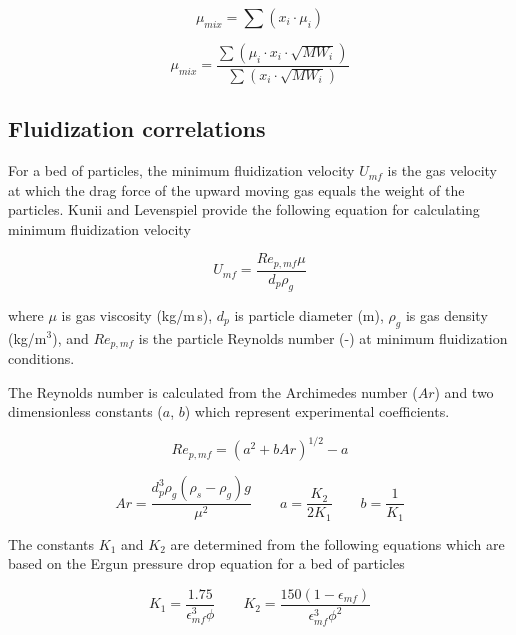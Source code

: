 \begin{equation}\label{eq:graham}
    \mu_{mix} = \sum(x_i \cdot \mu_i)
\end{equation}

\begin{equation}\label{eq:herning}
    \mu_{mix} = \frac{\sum(\mu_i \cdot x_i \cdot \sqrt{MW_i})}{\sum(x_i \cdot \sqrt{MW_i})}
\end{equation}

\subsection{Fluidization correlations}

For a bed of particles, the minimum fluidization velocity $U_{mf}$ is the gas velocity at which the drag force of the upward moving gas equals the weight of the particles. Kunii and Levenspiel \cite{Levenspiel-1991} provide the following equation for calculating minimum fluidization velocity

\begin{equation}
    U_{mf} = \frac{Re_{p,mf} \mu}{d_p \rho_g}
\end{equation}

\noindent where $\mu$ is gas viscosity (kg/m\,s), $d_p$ is particle diameter (m), $\rho_g$ is gas density (kg/m$^3$), and $Re_{p,mf}$ is the particle Reynolds number (-) at minimum fluidization conditions.

The Reynolds number is calculated from the Archimedes number ($Ar$) and two dimensionless constants ($a$, $b$) which represent experimental coefficients.

\begin{equation}
    Re_{p,mf} = \left( a^2 + b Ar \right)^{1/2} - a
\end{equation}

\begin{equation}
    Ar = \frac{d_p^3 \rho_g (\rho_s - \rho_g) g}{\mu^2} \qquad
    a = \frac{K_2}{2 K_1} \qquad
    b = \frac{1}{K_1}
\end{equation}

\noindent The constants $K_1$ and $K_2$ are determined from the following equations which are based on the Ergun pressure drop equation for a bed of particles

\begin{equation}
    K_1 = \frac{1.75}{\epsilon_{mf}^3 \phi} \qquad
    K_2 = \frac{150(1-\epsilon_{mf})}{\epsilon_{mf}^3 \phi^2}
\end{equation}

